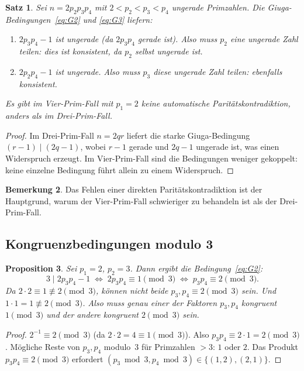 \documentclass[12pt,a4paper]{amsart}
\newtheorem{theorem}{Satz}[section]
\newtheorem{proposition}[theorem]{Proposition}
\theoremstyle{definition}
\newtheorem{remark}[theorem]{Bemerkung}
\begin{document}
\begin{theorem}
\label{satz:paritaet}
Sei $n = 2 p_2 p_3 p_4$ mit $2 < p_2 < p_3 < p_4$ ungerade Primzahlen.
Die Giuga-Bedingungen~\eqref{eq:G2} und \eqref{eq:G3} liefern:
\begin{enumerate}[label=\textup{(\alph*)}]
  \item $2 p_3 p_4 - 1$ ist ungerade (da $2 p_3 p_4$ gerade ist).  Also muss
        $p_2$ eine ungerade Zahl teilen: dies ist konsistent, da $p_2$ selbst
        ungerade ist.
  \item $2 p_2 p_4 - 1$ ist ungerade.  Also muss $p_3$ diese ungerade Zahl
        teilen: ebenfalls konsistent.
\end{enumerate}
Es gibt im Vier-Prim-Fall mit $p_1 = 2$ \emph{keine automatische
Paritätskontradiktion}, anders als im Drei-Prim-Fall.
\end{theorem}

\begin{proof}
Im Drei-Prim-Fall $n = 2qr$ liefert die starke Giuga-Bedingung
$(r-1) \mid (2q-1)$, wobei $r-1$ gerade und $2q-1$ ungerade ist, was einen
Widerspruch erzeugt.  Im Vier-Prim-Fall sind die Bedingungen weniger gekoppelt:
keine einzelne Bedingung führt allein zu einem Widerspruch.
\end{proof}

\begin{remark}
Das Fehlen einer direkten Paritätskontradiktion ist der Hauptgrund, warum der
Vier-Prim-Fall schwieriger zu behandeln ist als der Drei-Prim-Fall.
\end{remark}

\subsection{Kongruenzbedingungen modulo 3}

\begin{proposition}
\label{prop:mod3}
Sei $p_1 = 2$, $p_2 = 3$.  Dann ergibt die Bedingung~\eqref{eq:G2}:
\[
  3 \mid 2 p_3 p_4 - 1 \;\Longleftrightarrow\; 2 p_3 p_4 \equiv 1 \pmod{3}
  \;\Longleftrightarrow\; p_3 p_4 \equiv 2 \pmod{3}.
\]
Da $2 \cdot 2 \equiv 1 \not\equiv 2 \pmod{3}$, können nicht beide
$p_3, p_4 \equiv 2 \pmod{3}$ sein.  Und $1 \cdot 1 = 1 \not\equiv 2 \pmod 3$.
Also muss genau einer der Faktoren $p_3, p_4$ kongruent $1 \pmod{3}$ und
der andere kongruent $2 \pmod{3}$ sein.
\end{proposition}

\begin{proof}
$2^{-1} \equiv 2 \pmod{3}$ (da $2 \cdot 2 = 4 \equiv 1 \pmod{3}$).  Also
$p_3 p_4 \equiv 2 \cdot 1 = 2 \pmod{3}$.  Mögliche Reste von $p_3, p_4$
modulo~$3$ für Primzahlen $> 3$: $1$ oder $2$.  Das Produkt $p_3 p_4 \equiv 2
\pmod 3$ erfordert $(p_3 \bmod 3, p_4 \bmod 3) \in \{(1,2), (2,1)\}$.
\end{proof}
\end{document}
